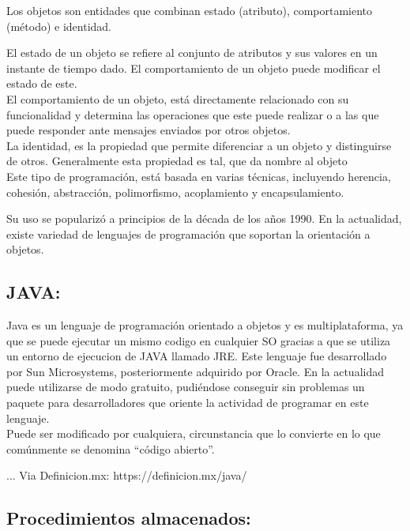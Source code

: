 \documentclass[spanish]{article}
\begin{document}
Los objetos son entidades que combinan estado (atributo), comportamiento (método) e identidad.

El estado de un objeto se refiere al conjunto de atributos y sus valores en un instante de tiempo dado. El comportamiento de un objeto puede modificar el estado de este.
\\
El comportamiento de un objeto, está directamente relacionado con su funcionalidad y determina las operaciones que este puede realizar o a las que puede responder ante mensajes enviados por otros objetos. \\

La identidad, es la propiedad que permite diferenciar a un objeto y distinguirse de otros. Generalmente esta propiedad es tal, que da nombre al objeto \\

Este tipo de programación, está basada en varias técnicas, incluyendo herencia, cohesión, abstracción, polimorfismo, acoplamiento y encapsulamiento.

Su uso se popularizó a principios de la década de los años 1990. En la actualidad, existe variedad de lenguajes de programación que soportan la orientación a objetos.

\subsection{JAVA:} 

Java es un lenguaje de programación orientado a objetos y es multiplataforma, ya que se puede ejecutar un mismo codigo en cualquier SO gracias a que se utiliza un entorno de ejecucion de JAVA llamado JRE.
Este lenguaje fue desarrollado por Sun Microsystems, posteriormente adquirido por Oracle. En la actualidad puede utilizarse de modo gratuito, pudiéndose conseguir sin problemas un paquete para desarrolladores que oriente la actividad de programar en este lenguaje. \\

 Puede ser modificado por cualquiera, circunstancia que lo convierte en lo que comúnmente se denomina “código abierto”.

... Via Definicion.mx: https://definicion.mx/java/


\subsection{Procedimientos almacenados:}
\end{document}
